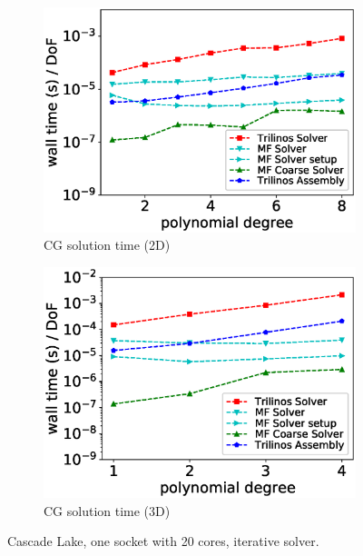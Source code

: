 \documentclass[AMA,STIX1COL]{WileyNJD-v2}
\begin{document}
\begin{figure}[!ht]
\begin{subfigure}[b]{0.49\textwidth}
    \includegraphics[width=\textwidth]{CSL_Munich_solver2d.eps}
    \caption{CG solution time (2D)}
    \label{fig:benchmark_miehe_Emmy_sol2}
  \end{subfigure}
  \begin{subfigure}[b]{0.49\textwidth}
    \centering
    \includegraphics[width=\textwidth]{CSL_Munich_solver3d.eps}
    \caption{CG solution time (3D)}
    \label{fig:benchmark_miehe_Emmy_sol3}
  \end{subfigure}
  \caption{Cascade Lake, one socket with 20 cores, iterative solver.}%
  \label{fig:benchmark_miehe_Emmy_cg}
\end{figure}
\end{document}
